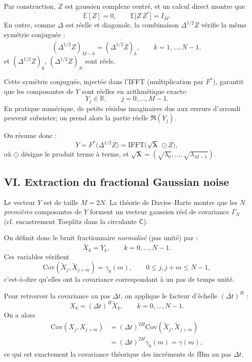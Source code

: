 \documentclass[11pt,a4paper]{article}
\newcommand{\R}{\mathbb{R}}
\newcommand{\E}{\mathbb{E}}
\newcommand{\Cov}{\mathrm{Cov}}
\newcommand{\1}{\mathbf{1}}
\begin{document}
Par construction, $Z$ est gaussien complexe centré, et un calcul
direct montre que
\[
  \E[Z] = 0,
  \qquad
  \E\bigl[Z\,Z^{\ast}\bigr] = I_M.
\]
En outre, comme $\Delta$ est réelle et diagonale, la combinaison
$\Delta^{1/2}Z$ vérifie la même symétrie conjuguée :
\[
  (\Delta^{1/2}Z)_{M-k}
  = \overline{(\Delta^{1/2}Z)_k},
  \qquad k=1,\dots,N-1,
\]
et $(\Delta^{1/2}Z)_0$, $(\Delta^{1/2}Z)_N$ sont réels.

Cette symétrie conjuguée, injectée dans l'IFFT (multiplication par
$F^{\ast}$), garantit que les composantes de $Y$ sont réelles en
arithmétique exacte:
\begin{equation}
  Y_j \in\R,\qquad j=0,\dots,M-1.
\end{equation}
En pratique numérique, de petits résidus imaginaires dus aux erreurs
d'arrondi peuvent subsister; on prend alors la partie réelle
$\Re(Y_j)$.

On résume donc :
\begin{equation}
  \label{eq:def-Y}
  Y = F^{\ast}\bigl(\Delta^{1/2} Z\bigr)
  = \mathrm{IFFT}\bigl(\sqrt{\bm{\lambda}}\;\odot Z\bigr),
\end{equation}
où $\odot$ désigne le produit terme à terme, et
$\sqrt{\bm{\lambda}}=(\sqrt{\lambda_0},\dots,\sqrt{\lambda_{M-1}})$.

\subsection*{VI. Extraction du fractional Gaussian noise}

Le vecteur $Y$ est de taille $M=2N$. La théorie de Davies--Harte montre
que les $N$ \emph{premières} composantes de $Y$ forment un vecteur
gaussien réel de covariance $\Gamma_N$ (cf. encastrement Toeplitz
dans la circulante $\mathsf{C}$).

On définit donc le bruit fractionnaire \emph{normalisé} (pas unité)
par :
\begin{equation}
  \label{eq:def-fGn-unit}
  \tilde{X}_k = Y_k,
  \qquad k=0,\dots,N-1.
\end{equation}
Ces variables vérifient
\begin{equation}
  \Cov(\tilde{X}_j,\tilde{X}_{j+m})
  = \gamma_0(m),
  \qquad 0\le j, j+m \le N-1,
\end{equation}
c'est-à-dire qu'elles ont la covariance correspondant à un pas de
temps unité.

Pour retrouver la covariance au pas $\Delta t$, on applique le
facteur d'échelle $(\Delta t)^H$ :
\begin{equation}
  X_k = (\Delta t)^H \tilde{X}_k,
  \qquad k=0,\dots,N-1.
\end{equation}
On a alors
\begin{align}
  \Cov(X_j,X_{j+m})
  &= (\Delta t)^{2H}\Cov(\tilde{X}_j,\tilde{X}_{j+m}) \\
  &= (\Delta t)^{2H}\gamma_0(m)
   = \gamma(m),
\end{align}
ce qui est exactement la covariance théorique des incréments de fBm
au pas $\Delta t$.
\end{document}
